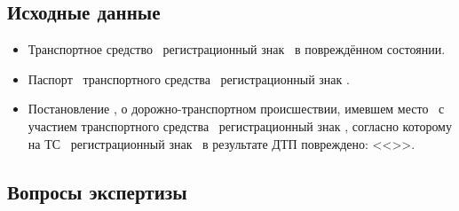 \setcounter{page}{1}

	       
\def\итог{380950}
\def\итогизнос{215550}	       
	       
	       
	                                                       
\subsection{Исходные данные}



\begin{itemize}
\item Транспортное средство \tc\, регистрационный знак \,  в повреждённом состоянии.


\item  Паспорт  \,  транспортного средства   \, регистрационный знак .

\item  Постановление , о дорожно-транспортном происшествии, имевшем место  \, с участием  транспортного средства \, регистрационный знак , согласно которому на ТС \, регистрационный знак \,  в результате ДТП повреждено:  << >>.  
 



\end{itemize}                                      

\subsection{Вопросы  экспертизы}
      
